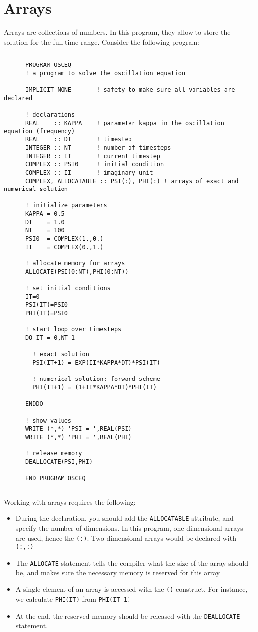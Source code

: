 \documentclass[a4paper]{article}
\begin{document}
\section{Arrays}
%
\par
Arrays are collections of numbers. In this program, they allow to store the solution for the full time-range. Consider the following program:
%
{\vspace{10pt}\hrule\small\vspace*{-2pt}\begin{verbatim}
	  PROGRAM OSCEQ
	  ! a program to solve the oscillation equation

	  IMPLICIT NONE       ! safety to make sure all variables are declared

	  ! declarations
	  REAL    :: KAPPA    ! parameter kappa in the oscillation equation (frequency)
	  REAL    :: DT       ! timestep
	  INTEGER :: NT       ! number of timesteps
	  INTEGER :: IT       ! current timestep
	  COMPLEX :: PSI0     ! initial condition
	  COMPLEX :: II       ! imaginary unit
	  COMPLEX, ALLOCATABLE :: PSI(:), PHI(:) ! arrays of exact and numerical solution

	  ! initialize parameters
	  KAPPA = 0.5
	  DT    = 1.0
	  NT    = 100
	  PSI0  = COMPLEX(1.,0.)
	  II    = COMPLEX(0.,1.)

	  ! allocate memory for arrays
	  ALLOCATE(PSI(0:NT),PHI(0:NT))

	  ! set initial conditions
	  IT=0
	  PSI(IT)=PSI0
	  PHI(IT)=PSI0

	  ! start loop over timesteps
	  DO IT = 0,NT-1
	  	
	  	! exact solution
	  	PSI(IT+1) = EXP(II*KAPPA*DT)*PSI(IT)
	  	
	  	! numerical solution: forward scheme
	  	PHI(IT+1) = (1+II*KAPPA*DT)*PHI(IT)
	  	
	  ENDDO

	  ! show values
	  WRITE (*,*) 'PSI = ',REAL(PSI)
	  WRITE (*,*) 'PHI = ',REAL(PHI)

	  ! release memory
	  DEALLOCATE(PSI,PHI)

	  END PROGRAM OSCEQ
\end{verbatim}\hrule\vspace{5pt}}
%
\par
Working with arrays requires the following:
%
\begin{itemize}
	\item During the declaration, you should add the \verb+ALLOCATABLE+ attribute, and specify the number of dimensions. In this program, one-dimensional arrays are used, hence the \verb+(:)+. Two-dimensional arrays would be declared with \verb+(:,:)+
	\item The \verb+ALLOCATE+ statement tells the compiler what the size of the array should be, and makes sure the necessary memory is reserved for this array
	\item A single element of an array is accessed with the \verb+()+ construct. For instance, we calculate \verb+PHI(IT)+ from \verb+PHI(IT-1)+
	\item At the end, the reserved memory should be released with the \verb+DEALLOCATE+ statement.
\end{itemize}
\end{document}
